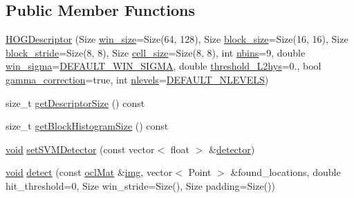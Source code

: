 \subsection*{Public Member Functions}
\begin{DoxyCompactItemize}
\item 
\hyperlink{structcv_1_1ocl_1_1HOGDescriptor_ac1157c7baf7cfb1e75880e8e3c66aa17}{H\-O\-G\-Descriptor} (Size \hyperlink{structcv_1_1ocl_1_1HOGDescriptor_a64a0fb7b26799b3b7b62ecc3db2c5601}{win\-\_\-size}=Size(64, 128), Size \hyperlink{structcv_1_1ocl_1_1HOGDescriptor_a2d0121236387d4113568acb367b5f2ef}{block\-\_\-size}=Size(16, 16), Size \hyperlink{structcv_1_1ocl_1_1HOGDescriptor_aae17ffc7bbc09ec8f7485a00724fc9b0}{block\-\_\-stride}=Size(8, 8), Size \hyperlink{structcv_1_1ocl_1_1HOGDescriptor_af6d032325c0a50fdf0faf4cf559ee4cf}{cell\-\_\-size}=Size(8, 8), int \hyperlink{structcv_1_1ocl_1_1HOGDescriptor_ab2b56c734be1244d99ed925580e1e54e}{nbins}=9, double \hyperlink{structcv_1_1ocl_1_1HOGDescriptor_ab022766fbe3ac26172e15cefaa4c5a25}{win\-\_\-sigma}=\hyperlink{structcv_1_1ocl_1_1HOGDescriptor_a15ea7c60854f4623d645e9cf7cf9b69ba18bf6dea38c97cf555b692fb916e1803}{D\-E\-F\-A\-U\-L\-T\-\_\-\-W\-I\-N\-\_\-\-S\-I\-G\-M\-A}, double \hyperlink{structcv_1_1ocl_1_1HOGDescriptor_aa46d855bd7e5532380e5a96f97f90b11}{threshold\-\_\-\-L2hys}=0., bool \hyperlink{structcv_1_1ocl_1_1HOGDescriptor_ab27413637f05ea0eac7a0dfcc2d1921b}{gamma\-\_\-correction}=true, int \hyperlink{structcv_1_1ocl_1_1HOGDescriptor_a73e83320d5318b5703a6ca9b05038ab2}{nlevels}=\hyperlink{structcv_1_1ocl_1_1HOGDescriptor_a0ea747b7fd46b8ba3ef6a8c0046e2222a8fe4e2e78c3e8e64497d87af9dd8ca20}{D\-E\-F\-A\-U\-L\-T\-\_\-\-N\-L\-E\-V\-E\-L\-S})
\item 
size\-\_\-t \hyperlink{structcv_1_1ocl_1_1HOGDescriptor_abbd30e55004c7a42143cfed5134da9d5}{get\-Descriptor\-Size} () const 
\item 
size\-\_\-t \hyperlink{structcv_1_1ocl_1_1HOGDescriptor_a5752938f3d4a1c29a58bfc943f908e59}{get\-Block\-Histogram\-Size} () const 
\item 
\hyperlink{legacy_8hpp_a8bb47f092d473522721002c86c13b94e}{void} \hyperlink{structcv_1_1ocl_1_1HOGDescriptor_a789ee263a38868a1ecadb08d5feac593}{set\-S\-V\-M\-Detector} (const vector$<$ float $>$ \&\hyperlink{structcv_1_1ocl_1_1HOGDescriptor_a52a29986e44a552923de5c5669f2e130}{detector})
\item 
\hyperlink{legacy_8hpp_a8bb47f092d473522721002c86c13b94e}{void} \hyperlink{structcv_1_1ocl_1_1HOGDescriptor_a97913083c1c3219fdabfb2937506471e}{detect} (const \hyperlink{classcv_1_1ocl_1_1oclMat}{ocl\-Mat} \&\hyperlink{legacy_8hpp_a5349238b3772bed6eae0fda3117ccfef}{img}, vector$<$ Point $>$ \&found\-\_\-locations, double hit\-\_\-threshold=0, Size win\-\_\-stride=Size(), Size padding=Size())

\end{DoxyCompactItemize}
